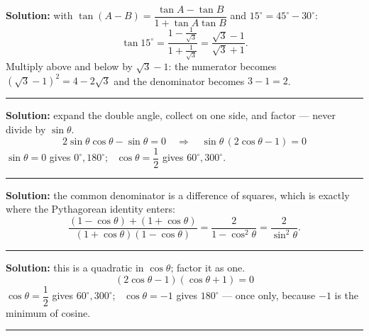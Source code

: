 \documentclass[12pt]{article}
\begin{document}

\textbf{Solution:} with $\tan(A - B) = \dfrac{\tan A - \tan B}{1 + \tan A\tan B}$ and $15^\circ = 45^\circ - 30^\circ$:
\[ \tan 15^\circ = \frac{1 - \frac{1}{\sqrt{3}}}{1 + \frac{1}{\sqrt{3}}} = \frac{\sqrt{3} - 1}{\sqrt{3} + 1}. \]
Multiply above and below by $\sqrt{3} - 1$: the numerator becomes $(\sqrt{3}-1)^2 = 4 - 2\sqrt{3}$ and the denominator becomes $3 - 1 = 2$. 

\vspace{0.12cm}\noindent\rule{\linewidth}{0.2pt}\vspace{0.12cm}


\textbf{Solution:} expand the double angle, collect on one side, and factor --- never divide by $\sin\theta$.
\[ 2\sin\theta\cos\theta - \sin\theta = 0 \quad\Longrightarrow\quad \sin\theta\,(2\cos\theta - 1) = 0 \]
$\sin\theta = 0$ gives $0^\circ, 180^\circ$; \ $\cos\theta = \dfrac{1}{2}$ gives $60^\circ, 300^\circ$. 

\vspace{0.12cm}\noindent\rule{\linewidth}{0.2pt}\vspace{0.12cm}


\textbf{Solution:} the common denominator is a difference of squares, which is exactly where the Pythagorean identity enters:
\[ \frac{(1 - \cos\theta) + (1 + \cos\theta)}{(1 + \cos\theta)(1 - \cos\theta)} = \frac{2}{1 - \cos^2\theta} = \frac{2}{\sin^2\theta}. \]

\vspace{0.12cm}\noindent\rule{\linewidth}{0.2pt}\vspace{0.12cm}


\textbf{Solution:} this is a quadratic in $\cos\theta$; factor it as one.
\[ (2\cos\theta - 1)(\cos\theta + 1) = 0 \]
$\cos\theta = \dfrac{1}{2}$ gives $60^\circ, 300^\circ$; \ $\cos\theta = -1$ gives $180^\circ$ --- once only, because $-1$ is the minimum of cosine. 

\vspace{0.12cm}\noindent\rule{\linewidth}{0.2pt}\vspace{0.12cm}
\end{document}
